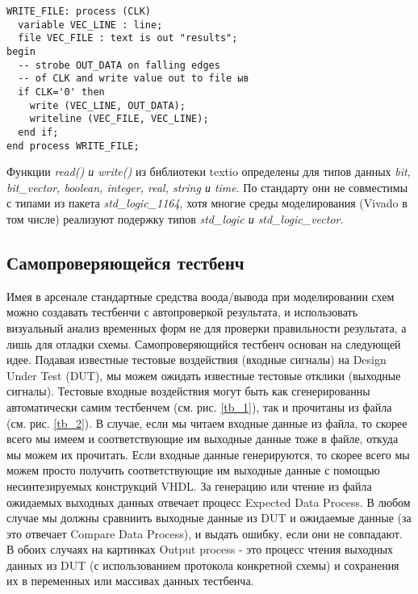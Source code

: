 \begin{Code}
\begin{lstlisting}
WRITE_FILE: process (CLK)
  variable VEC_LINE : line;
  file VEC_FILE : text is out "results";
begin
  -- strobe OUT_DATA on falling edges
  -- of CLK and write value out to file ыв
  if CLK='0' then
    write (VEC_LINE, OUT_DATA);
    writeline (VEC_FILE, VEC_LINE);
  end if;
end process WRITE_FILE;
\end{lstlisting}
\end{Code}

Функции \emph{read() и write()} из библиотеки textio определены для типов данных \emph{bit, bit\_vector, boolean, integer, real, string и time}. По стандарту они не совместимы с типами из пакета \emph{std\_logic\_1164}, хотя многие среды моделирования (Vivado в том числе) реализуют подержку типов \emph{std\_logic и std\_logic\_vector}.


\subsection{Самопроверяющейся тестбенч}

Имея в арсенале стандартные средства воода/вывода при моделировании схем можно создавать тестбенчи с автопроверкой результата, и использовать визуальный анализ временных форм не для проверки правильности результата, а лишь для отладки схемы. Самопроверяющийся тестбенч основан на следующей идее. Подавая известные тестовые воздействия (входные сигналы) на Design Under Test (DUT), мы можем ожидать известные тестовые отклики (выходные сигналы). Тестовые входные воздействия могут быть как сгенерированны автоматически самим тестбенчем (см. рис. \ref{tb_1}), так и прочитаны из файла (см. рис. \ref{tb_2}). В случае, если мы читаем входные данные из файла, то скорее всего мы имеем и соответствующие им выходные данные тоже в файле, откуда мы можем их прочитать. Если входные данные генерируются, то скорее всего мы можем просто получить соответствующие им выходные данные с помощью несинтезируемых конструкций VHDL. За генерацию или чтение из файла ожидаемых выходных данных отвечает процесс Expected Data Process. В любом случае мы должны сравниить выходные данные из DUT и ожидаемые данные (за это отвечает Compare Data Process), и выдать ошибку, если они не совпадают. В обоих случаях на картинках Output process - это процесс чтения выходных данных из DUT (с использованием протокола конкретной схемы) и сохранения их в переменных или массивах данных тестбенча. 

